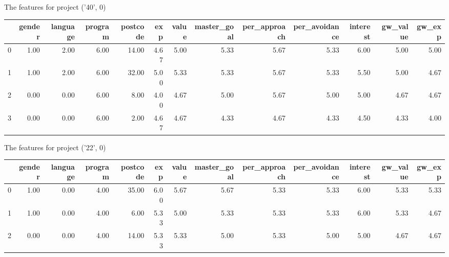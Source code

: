 \documentclass[7pt]{article}
\begin{document}
\begin{landscape}
The features for project ('40', 0)\newline
\begin{tabular}{lrrrrrrrrrrrr}
\toprule
{} &  gender &  language &  program &  postcode &  exp &  value &  master\_goal &  per\_approach &  per\_avoidance &  interest &  gw\_value &  gw\_exp \\
\midrule
0 &    1.00 &      2.00 &     6.00 &     14.00 & 4.67 &   5.00 &         5.33 &          5.67 &           5.33 &      6.00 &             5.00 &           5.00 \\
1 &    1.00 &      2.00 &     6.00 &     32.00 & 5.00 &   5.33 &         5.33 &          5.67 &           5.33 &      5.50 &             5.00 &           4.67 \\
2 &    0.00 &      0.00 &     6.00 &      8.00 & 4.00 &   4.67 &         5.00 &          5.67 &           5.00 &      5.00 &             4.67 &           4.67 \\
3 &    0.00 &      0.00 &     6.00 &      2.00 & 4.67 &   4.67 &         4.33 &          4.67 &           4.33 &      4.50 &             4.33 &           4.00 \\
\bottomrule
\end{tabular}

The features for project ('22', 0)\newline
\begin{tabular}{lrrrrrrrrrrrr}
\toprule
{} &  gender &  language &  program &  postcode &  exp &  value &  master\_goal &  per\_approach &  per\_avoidance &  interest &  gw\_value &  gw\_exp \\
\midrule
0 &    1.00 &      0.00 &     4.00 &     35.00 & 6.00 &   5.67 &         5.67 &          5.33 &           5.33 &      6.00 &             5.33 &           5.33 \\
1 &    1.00 &      0.00 &     4.00 &      6.00 & 5.33 &   5.00 &         5.33 &          5.33 &           5.33 &      6.00 &             5.33 &           4.67 \\
2 &    0.00 &      0.00 &     4.00 &     14.00 & 5.33 &   5.33 &         5.00 &          5.33 &           5.00 &      5.00 &             4.67 &           4.67 \\
\bottomrule
\end{tabular}


\end{landscape}
\end{document}
